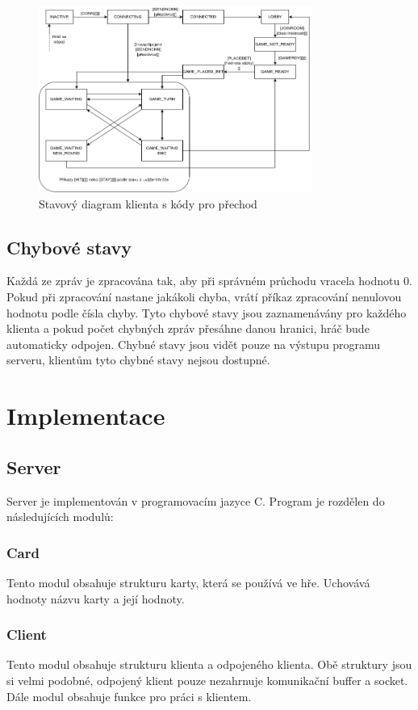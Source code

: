 \documentclass[12pt]{article}
\begin{document}
\begin{figure}[!htbp]
\centering
\includegraphics[width=0.8\textwidth]{stateDiagramCodes.png}
\caption{Stavový diagram klienta s kódy pro přechod}
\end{figure}

\subsection{Chybové stavy}

	Každá ze zpráv je zpracována tak, aby při správném průchodu vracela hodnotu 0. Pokud při zpracování nastane jakákoli chyba, vrátí příkaz zpracování nenulovou hodnotu podle čísla chyby. Tyto chybové stavy jsou zaznamenávány pro každého klienta a pokud počet chybných zpráv přesáhne danou hranici, hráč bude automaticky odpojen. Chybné stavy jsou vidět pouze na výstupu programu serveru, klientům tyto chybné stavy nejsou dostupné.
	
\newpage
\section{Implementace}
\subsection{Server}
Server je implementován v programovacím jazyce C. Program je rozdělen do následujících modulů:
\subsubsection{Card}
Tento modul obsahuje strukturu karty, která se používá ve hře. Uchovává hodnoty názvu karty a její hodnoty. 
\subsubsection{Client}
Tento modul obsahuje strukturu klienta a odpojeného klienta. Obě struktury jsou si velmi podobné, odpojený klient pouze nezahrnuje komunikační buffer a socket. Dále modul obsahuje funkce pro práci s klientem.
\end{document}
